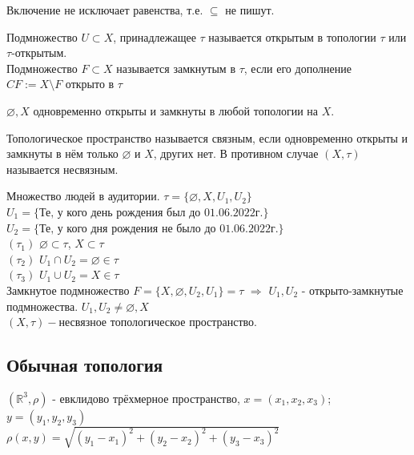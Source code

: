 \documentclass[11pt,fleqn]{book} %
\begin{document}
\begin{remark}
Включение не исключает равенства, т.е. $\subseteq$ не пишут.
\end{remark}

\begin{definition}
Подмножество $U{\subset}X$, принадлежащее $\tau$ называется открытым в топологии $\tau$ или $\tau$-открытым.\\
Подмножество $F{\subset}X$ называется замкнутым в $\tau$, если его дополнение $CF:=X{\setminus}F$ открыто в $\tau$
\end{definition}

\begin{remark}
$\varnothing, X$ одновременно открыты и замкнуты в любой топологии на $X$.
\end{remark}

\begin{definition}
Топологическое пространство называется связным, если одновременно открыты и замкнуты в нём только $\varnothing$ и $X$, других нет. В противном случае $(X,\tau)$ называется несвязным.
\end{definition}

\begin{example}
Множество людей в аудитории. $\tau=\{\varnothing,X,U_1,U_2\}$\\
$U_1=\{\text{Те, у кого день рождения был до 01.06.2022г.}\}$\\
$U_2=\{\text{Те, у кого дня рождения не было до 01.06.2022г.}\}$\\
$(\tau_1)$ $\varnothing{\subset}\tau$, $X{\subset}\tau$\\
$(\tau_2)$ $U_1{\cap}U_2=\varnothing{\in}\tau$\\
$(\tau_3)$ $U_1{\cup}U_2=X{\in}\tau$\\
Замкнутое подмножество $F=\{X,\varnothing,U_2,U_1\}=\tau$ $\Rightarrow$ $U_1,U_2$ - открыто-замкнутые подмножества. $U_1,U_2{\neq}\varnothing,X$\\
$(X,\tau)-$несвязное топологическое пространство.
\end{example}

\subsection{Обычная топология}
$(\mathbb{R}^3,\rho)$ - евклидово трёхмерное пространство, $x=(x_1,x_2,x_3)$; $y=(y_1,y_2,y_3)$\\
$\rho(x,y)=\sqrt{(y_1-x_1)^2+(y_2-x_2)^2+(y_3-x_3)^2}$
\end{document}
